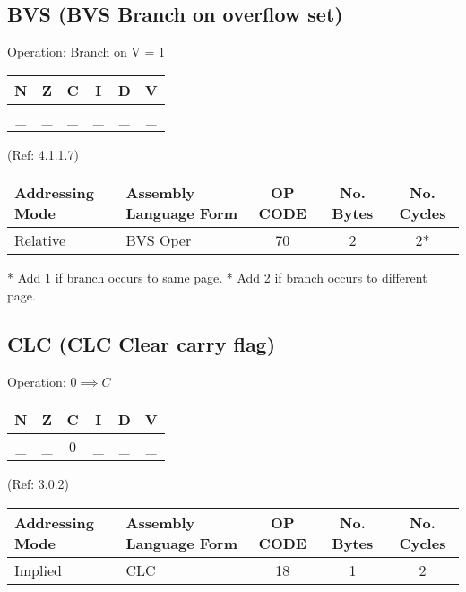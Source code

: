\documentclass{article}
\begin{document}
  \subsection{BVS (BVS Branch on overflow set)}

  Operation:  Branch on V = 1
  \begin{table}[H]
  \centering
  \begin{tabular}{|c c c c c c|}
  \hline
  N&Z&C&I&D&V\\
  \hline
  \_ & \_ & \_ & \_ & \_ & \_\\
  \hline
  \end{tabular}
  \end{table}
                               (Ref: 4.1.1.7)
  \begin{table}[H]
  \centering
  \begin{tabular}{|l|l|c|c|c|}
  \hline
   Addressing Mode& Assembly Language Form& OP CODE &No. Bytes&No. Cycles\\
  \hline
    Relative      &   BVS Oper            &    70   &    2    &    2*\\
  \hline
  \end{tabular}
  \end{table}
  * Add 1 if branch occurs to same page.
  * Add 2 if branch occurs to different page.


  \subsection{CLC (CLC Clear carry flag)}

  Operation:  $0 \implies C$
  \begin{table}[H]
  \centering
  \begin{tabular}{|c c c c c c|}
  \hline
  N&Z&C&I&D&V\\
  \hline
  \_ & \_ & 0 & \_ & \_ & \_\\
  \hline
  \end{tabular}
  \end{table}
                                (Ref: 3.0.2)
  \begin{table}[H]
  \centering
  \begin{tabular}{|l|l|c|c|c|}
  \hline
   Addressing Mode& Assembly Language Form& OP CODE &No. Bytes&No. Cycles\\
  \hline
    Implied       &   CLC                 &    18   &    1    &    2\\
  \hline
  \end{tabular}
  \end{table}
\end{document}
